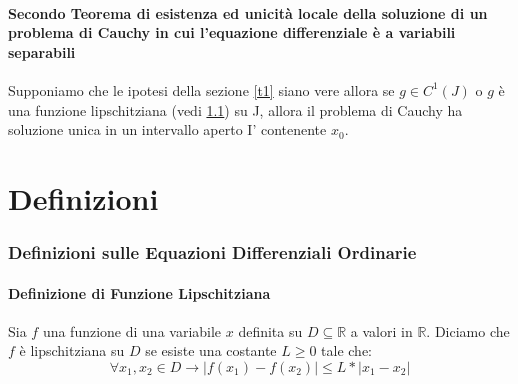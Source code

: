 \documentclass{article}
\begin{document}
			\subsection{Secondo Teorema di esistenza ed unicità locale della soluzione di un problema di Cauchy in cui l'equazione differenziale è a variabili separabili}
			
				Supponiamo che le ipotesi della sezione \ref{t1} siano vere allora se $g \in C^1(J)$ o $g$ è una funzione lipschitziana (vedi \ref{d1}) su J, allora il problema di Cauchy ha soluzione unica in un intervallo aperto I' contenente $x_0$.
			
	\part*{Definizioni}
		\section{Definizioni sulle Equazioni Differenziali Ordinarie}
		
			\subsection{Definizione di Funzione Lipschitziana}\label{d1}
			
				Sia $f$ una funzione di una variabile $x$ definita su $D \subseteq \mathbb{R}$ a valori in $\mathbb{R}$. Diciamo che $f$ è lipschitziana su $D$ se esiste una costante $L \ge 0$ tale che:
				\begin{equation*}
						\forall x_1, x_2 \in D \rightarrow \lvert f(x_1) - f(x_2) \rvert \le L * \lvert x_1 - x_2 \rvert
				\end{equation*}
				
\end{document}
